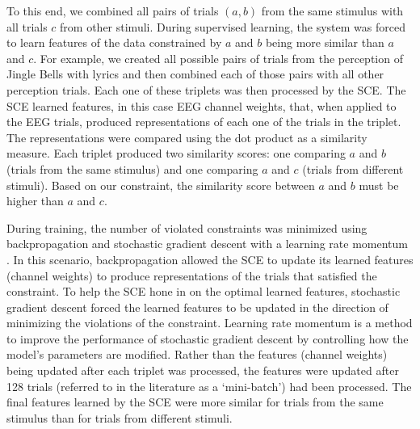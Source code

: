 To this end, we combined all pairs of trials $(a,b)$ from the same stimulus with all trials $c$ from other stimuli.
During supervised learning, the system was forced to learn features of the data constrained by $a$ and $b$ being more similar than $a$ and $c$. 
For example, we created all possible pairs of trials from the perception of Jingle Bells with lyrics and then combined each of those pairs with all other perception trials.
Each one of these triplets was then processed by the \ac{SCE}. %
The \ac{SCE} learned features, in this case EEG channel weights, that, when applied to the EEG trials, produced representations of each one of the trials in the triplet. 
The representations were compared using the dot product as a similarity measure. 
Each triplet produced two similarity scores: one comparing $a$ and $b$ (trials from the same stimulus) and one comparing $a$ and $c$ (trials from different stimuli).
Based on our constraint, the similarity score between $a$ and $b$ must be higher than $a$ and $c$.

During training, the number of violated constraints was minimized using backpropagation and stochastic gradient descent with a learning rate momentum \cite{rumelhart1988learning}.
In this scenario, backpropagation allowed the \ac{SCE} to update its learned features (channel weights) to produce representations of the trials that satisfied the constraint. 
To help the \ac{SCE} hone in on the optimal learned features, stochastic gradient descent forced the learned features to be updated in the direction of minimizing the violations of the constraint. 
Learning rate momentum is a method to improve the performance of stochastic gradient descent by controlling how the model's parameters are modified.
Rather than the features (channel weights) being updated after each triplet was processed, the features were updated after 128 trials (referred to in the literature as a `mini-batch') had been processed.
The final features learned by the \ac{SCE} were more similar for trials from the same stimulus than for trials from different stimuli.  

